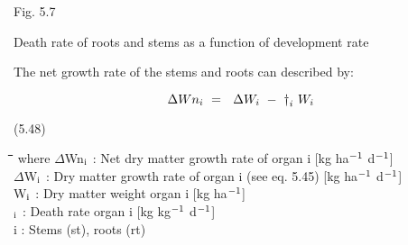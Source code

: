  \begin{figure}[htbp]
\begin{forcewidth}{10.05cm}
 \begin{center} \end{center}
\end{forcewidth}
\end{figure}














Fig. 5.7
\testlastline

\begin{indenting}{2.54cm}
Death rate of roots and stems as a function of development rate
\end{indenting}



The net {\nobreak}growth rate of the stems and roots can described by:

\begin{displaymath}
\Delta Wn _{i~} =~\,\,\Delta W _{i~} -~ {\rm \dag } _{i} \,\, W _{i} 
\end{displaymath}

 
\strut\hfill (5.48)
\nwln
\begin{tabbing}
\hspace{1.27cm}\=\hspace{1.27cm}\=\hspace{1.27cm}\=\hspace{1.27cm}\=%
\hspace{1.27cm}\=\hspace{1.27cm}\=\hspace{1.27cm}\=\hspace{1.27cm}\=%
\hspace{1.27cm}\=\hspace{1.27cm}\=\kill
where $\Delta$Wn$_{{\rm i}}$ : Net dry matter growth rate of organ i        [kg ha$^{{\rm -1}}$ d$^{{\rm -1}}$]\\
$\Delta$W$_{{\rm i}}$ : Dry matter growth rate of organ i (see eq. 5.45)        [kg ha$^{{\rm -1}}$ d$^{{\rm -1}}$]\\
W$_{{\rm i}}$ : Dry matter weight organ i        [kg ha$^{{\rm -1}}$]\\
\dag $_{{\rm i}}$ : Death rate organ i        [kg kg$^{{\rm -1}}$ d$^{{\rm -1}}$]\\
i : Stems (st), roots (rt)
\end{tabbing}

